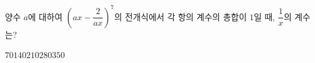 양수 $a$에 대하여 $\left(ax-\dfrac{2}{ax}\right)^7$의 전개식에서 각 항의 계수의 총합이 $1$일 때, $\dfrac{1}{x}$의 계수는?
\begin{choices32}{$70$}{$140$}{$210$}{$280$}{$350$}\end{choices32}
